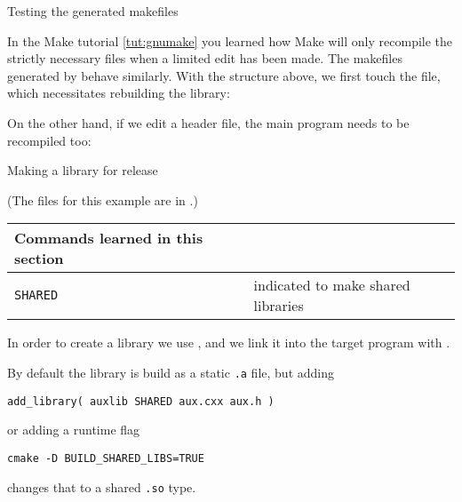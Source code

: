  {Testing the generated makefiles}

In the Make tutorial \ref{tut:gnumake} you learned how Make will only recompile
the strictly necessary files when a limited edit has been made.
The makefiles generated by  behave similarly.
With the structure above, we first touch the  file,
which necessitates rebuilding the library:
%


On the other hand, if we edit a header file, the main program
needs to be recompiled too:
%


 {Making a library for release}
\label{sec:cmake-public-lib}

(The files for this example are in .)

\begin{tabular}{lp{3in}}
  \toprule
  Commands learned in this section\\
  \midrule
  \lstinline+SHARED+&indicated to make shared libraries\\
  \bottomrule
\end{tabular}

\begin{floatingfigure}[r]{2.5in}
  \begin{minipage}{2.5in}
  \end{minipage}
\end{floatingfigure}
%
In order to create a library we use ,
and we link it into the target program with .

By default the library is build as a static \texttt{.a} file,
but adding
\begin{lstlisting}
add_library( auxlib SHARED aux.cxx aux.h )
\end{lstlisting}
or adding a runtime flag
\begin{verbatim}
cmake -D BUILD_SHARED_LIBS=TRUE
\end{verbatim}
changes that to a shared \texttt{.so} type.

